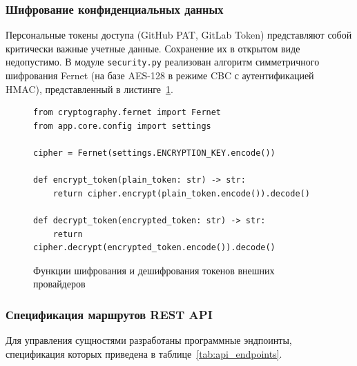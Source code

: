 \subsubsection{Шифрование конфиденциальных данных}
Персональные токены доступа (GitHub PAT, GitLab Token) представляют собой критически важные учетные данные. Сохранение их в открытом виде недопустимо. В модуле \texttt{security.py} реализован алгоритм симметричного шифрования Fernet (на базе AES-128 в режиме CBC с аутентификацией HMAC), представленный в листинге~\ref{lst:fernet_crypto}.

\begin{figure}[H]
\centering
\begin{minipage}{0.95\textwidth}
\footnotesize
\begin{verbatim}
from cryptography.fernet import Fernet
from app.core.config import settings

cipher = Fernet(settings.ENCRYPTION_KEY.encode())

def encrypt_token(plain_token: str) -> str:
    return cipher.encrypt(plain_token.encode()).decode()

def decrypt_token(encrypted_token: str) -> str:
    return cipher.decrypt(encrypted_token.encode()).decode()
\end{verbatim}
\end{minipage}
\caption{Функции шифрования и дешифрования токенов внешних провайдеров}
\label{lst:fernet_crypto}
\end{figure}

\subsubsection{Спецификация маршрутов REST API}
Для управления сущностями разработаны программные эндпоинты, спецификация которых приведена в таблице~\ref{tab:api_endpoints}.

